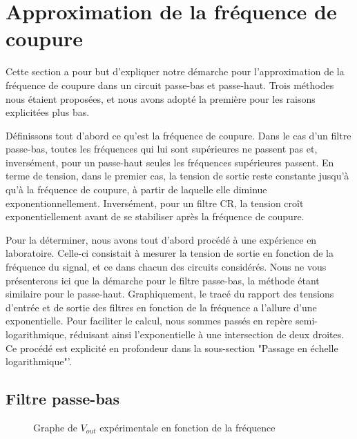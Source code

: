 

\section{Approximation de la fréquence de coupure}

Cette section a pour but d'expliquer notre démarche pour l'approximation de la fréquence de coupure
dans un circuit passe-bas et passe-haut. Trois méthodes nous étaient proposées, et nous avons adopté
la première pour les raisons explicitées plus bas.

Définissons tout d'abord ce qu'est la fréquence de coupure. Dans le cas d'un filtre passe-bas, toutes les fréquences qui
lui sont supérieures ne passent pas et, inversément, pour un passe-haut seules les fréquences supérieures passent.
En terme de tension, dans le premier cas, la tension de sortie reste constante jusqu'à qu'à la fréquence de coupure,
à partir de laquelle elle diminue exponentionnellement. Inversément, pour un filtre CR, la tension croît
exponentiellement avant de se stabiliser après la fréquence de coupure.

Pour la déterminer, nous avons tout d'abord procédé à une expérience en laboratoire.
Celle-ci consistait à mesurer la tension de sortie en fonction de la fréquence du signal, et ce dans
chacun des circuits considérés. Nous ne vous présenterons ici que la démarche pour le filtre passe-bas, 
la méthode étant similaire pour le passe-haut.
Graphiquement, le tracé du rapport des tensions d'entrée et de sortie des filtres en fonction de la
fréquence a l'allure d'une exponentielle. Pour faciliter le calcul, nous sommes passés en repère
semi-logarithmique, réduisant ainsi l'exponentielle à une intersection de deux droites. Ce procédé est
explicité en profondeur dans la sous-section "Passage en échelle logarithmique"'.

\subsection{Filtre passe-bas}

\begin{figure}[ht!]
\centering
{}
\caption{Graphe de $V_{out}$ expérimentale en fonction de la fréquence}
\label{lwp_ratio}
\end{figure}

